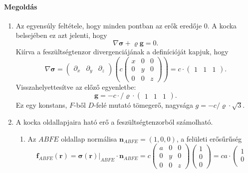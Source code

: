 \documentclass[12pt,a4paper]{scrartcl}
\let\mathbf\bm
\begin{document}
\paragraph{Megoldás}
\begin{enumerate}
\item 
Az egyensúly feltétele, hogy minden pontban az erők eredője 0. A kocka belsejében ez azt jelenti, hogy
\[\nabla {\mathbf{\sigma }} + \varrho {\mathbf{g}} = 0.\]
Kiírva a feszültségtenzor divergenciájának a definícióját kapjuk, hogy
\[\nabla {\mathbf{\sigma }} = \left( {\begin{array}{*{20}{c}}
  {{\partial _x}}&{{\partial _y}}&{{\partial _z}} 
\end{array}} \right)\left( {c\left( {\begin{array}{*{20}{c}}
  x&0&0 \\ 
  0&y&0 \\ 
  0&0&z 
\end{array}} \right)} \right) = c \cdot \left( {\begin{array}{*{20}{c}}
  1&1&1 
\end{array}} \right).\]
Visszahelyettesítve az előző egyenletbe:
\[{\mathbf{g}} =  - c \cdot /\varrho  \cdot \left( {\begin{array}{*{20}{c}}
  1&1&1 
\end{array}} \right).\] 
Ez egy konstans, $F$-ből $D$-felé mutató tömegerő, nagysága $g =  - c/\varrho  \cdot \sqrt 3 $.
\item A kocka oldallapjaira ható erő a feszültségtenzorból számolható.
\begin{enumerate}
\item Az $ABFE$ oldallap normálisa ${{\mathbf{n}}_{ABFE}} = \left( {1,0,0} \right)$, a felületi erősűrűség 
\[{{\mathbf{f}}_{ABFE}}\left( {\mathbf{r}} \right) = {\left. {{\mathbf{\sigma }}\left( {\mathbf{r}} \right)} \right|_{ABFE}} \cdot {{\mathbf{n}}_{ABFE}} = c\left( {\begin{array}{*{20}{c}}
  a&0&0 \\ 
  0&y&0 \\ 
  0&0&z 
\end{array}} \right)\left( {\begin{array}{*{20}{c}}
  1 \\ 
  0 \\ 
  0 
\end{array}} \right) = ca\cdot \left( {\begin{array}{*{20}{c}}
  1 \\ 
  0 \\ 

\end{array}}\]
\end{enumerate}
\end{enumerate}
\end{document}
